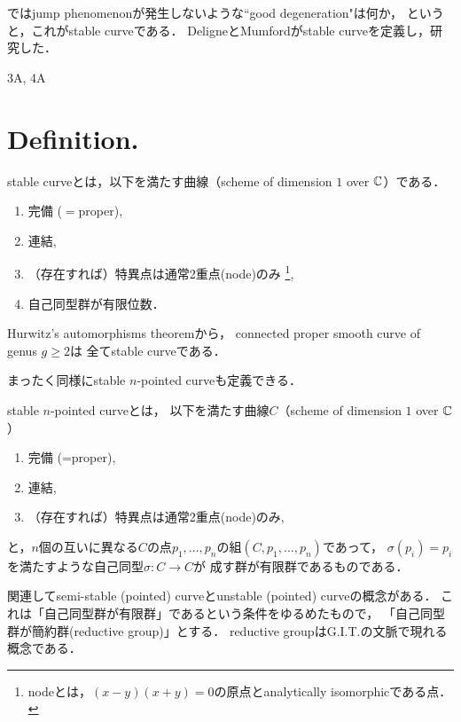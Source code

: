 \documentclass[a4paper]{jsarticle}
\begin{document}
    ではjump phenomenonが発生しないような``good degeneration"は何か，
    というと，これがstable curveである．
    DeligneとMumfordがstable curveを定義し，研究した．

    3A, 4A

\section{Definition.}
    \begin{Def}
        stable curveとは，以下を満たす曲線（scheme of dimension $1$ over $\mathbb{C}$）である．
        \begin{enumerate}
            \item 完備 ($=$proper),
            \item 連結,
            \item （存在すれば）特異点は通常2重点(node)のみ
                   \footnote{ nodeとは，$(x-y)(x+y)=0$の原点とanalytically isomorphicである点． },
            \item 自己同型群が有限位数．
        \end{enumerate}
    \end{Def}
    \begin{Remark}
    Hurwitz's automorphisms theoremから，
    connected proper smooth curve of genus $g \geq 2$は
    全てstable curveである．
    \end{Remark}

    まったく同様にstable $n$-pointed curveも定義できる．
    \begin{Def}
        stable $n$-pointed curveとは，
        以下を満たす曲線$C$（scheme of dimension $1$ over $\mathbb{C}$）
        \begin{enumerate}
            \item 完備 (=proper),
            \item 連結,
            \item （存在すれば）特異点は通常2重点(node)のみ,
        \end{enumerate}
        と，$n$個の互いに異なる$C$の点$p_1,\dots,p_n$の組$(C, p_1,\dots,p_n)$であって，
        $\sigma(p_i)=p_i$を満たすような自己同型$\sigma: C \to C$が
        成す群が有限群であるものである．
    \end{Def}
    関連してsemi-stable (pointed) curveとunstable (pointed) curveの概念がある．
    これは「自己同型群が有限群」であるという条件をゆるめたもので，
    「自己同型群が簡約群(reductive group)」とする．
    reductive groupはG.I.T.の文脈で現れる概念である．
\end{document}
